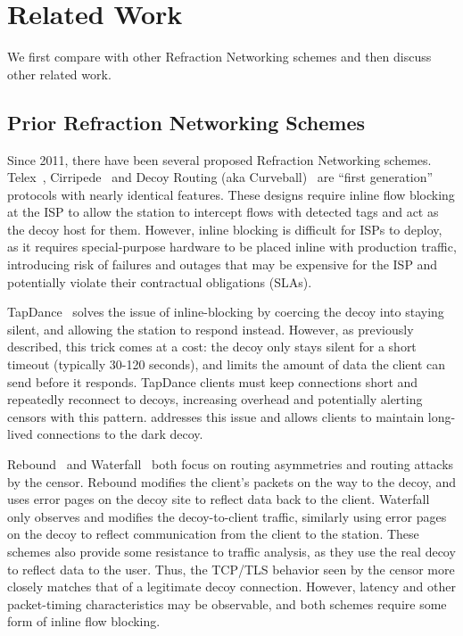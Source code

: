 \TabCompare

\section{Related Work}

We first compare \scheme with other Refraction Networking schemes and then discuss other related work.

\subsection{Prior Refraction Networking Schemes}

Since 2011, there have been several proposed Refraction Networking schemes.
Telex~\cite{telex11}, Cirripede~\cite{cirripede11} and Decoy
Routing (aka Curveball)~\cite{curveball11} are ``first generation'' protocols with nearly
identical features. These designs require inline flow blocking at the ISP to
allow the station to intercept flows with detected tags and act as the decoy
host for them. However, inline blocking is difficult for ISPs to deploy, as it
requires special-purpose hardware to be placed inline with production traffic,
introducing risk of failures and outages that may be expensive for the ISP
and potentially violate their contractual obligations (SLAs).

TapDance~\cite{tapdance14} solves the issue of inline-blocking by coercing the
decoy into staying silent, and allowing the station to respond instead. However,
as previously described, this trick comes at a cost: the decoy only stays silent
for a short timeout (typically 30-120 seconds), and limits the amount of data
the client can send before it responds. TapDance clients must keep connections
short and repeatedly reconnect to decoys, increasing overhead and potentially
alerting censors with this pattern. \scheme addresses this issue and allows
clients to maintain long-lived connections to the dark decoy.

Rebound~\cite{rebound15} and Waterfall~\cite{waterfall17} both focus on routing
asymmetries and routing attacks by the censor. Rebound modifies the client's
packets on the way to the decoy, and uses error pages on the decoy site to
reflect data back to the client. Waterfall only observes and modifies the
decoy-to-client traffic, similarly using error pages on the decoy to reflect
communication from the client to the station. These schemes also provide some
resistance to traffic analysis, as they use the real decoy to reflect data to
the user. Thus, the TCP/TLS behavior seen by the censor more closely matches
that of a legitimate decoy connection. However, latency and other packet-timing
characteristics may be observable, and both schemes require some form of inline
flow blocking.

